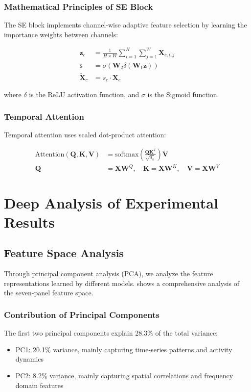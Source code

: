 \subsubsection{Mathematical Principles of SE Block}
The SE block implements channel-wise adaptive feature selection by learning the importance weights between channels:

\begin{align}
\mathbf{z}_c &= \frac{1}{H \times W} \sum_{i=1}^{H} \sum_{j=1}^{W} \mathbf{X}_{c,i,j} \\
\mathbf{s} &= \sigma(\mathbf{W}_2 \delta(\mathbf{W}_1 \mathbf{z})) \\
\tilde{\mathbf{X}}_c &= s_c \cdot \mathbf{X}_c
\end{align}

where $\delta$ is the ReLU activation function, and $\sigma$ is the Sigmoid function.

\subsubsection{Temporal Attention}
Temporal attention uses scaled dot-product attention:

\begin{align}
\text{Attention}(\mathbf{Q}, \mathbf{K}, \mathbf{V}) &= \text{softmax}\left(\frac{\mathbf{Q}\mathbf{K}^T}{\sqrt{d_k}}\right)\mathbf{V} \\
\mathbf{Q} &= \mathbf{X}\mathbf{W}^Q, \quad \mathbf{K} = \mathbf{X}\mathbf{W}^K, \quad \mathbf{V} = \mathbf{X}\mathbf{W}^V
\end{align}

\section{Deep Analysis of Experimental Results}
\label{sec:deep_analysis}

\subsection{Feature Space Analysis}
\label{subsec:feature_space}

Through principal component analysis (PCA), we analyze the feature representations learned by different models.  shows a comprehensive analysis of the seven-panel feature space.

\subsubsection{Contribution of Principal Components}
The first two principal components explain 28.3\% of the total variance:
\begin{itemize}
\item PC1: 20.1\% variance, mainly capturing time-series patterns and activity dynamics
\item PC2: 8.2\% variance, mainly capturing spatial correlations and frequency domain features
\end{itemize}

